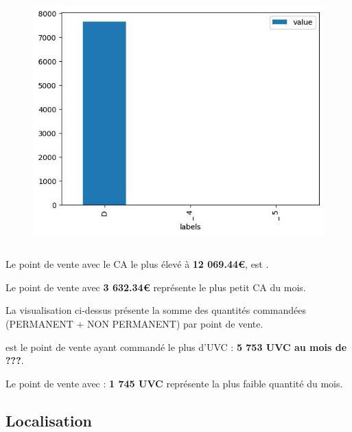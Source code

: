 \documentclass{beamer}
\begin{document}
\begin{frame}
\begin{columns}
\begin{column}{0.3333333333333333\textwidth}
\begin{center}
\begin{figure}[h]
                                \includegraphics[width=1\textwidth]{assets/ca_1.jpg}
                                \centering
                            \end{figure}
                        \end{center}
                    \end{column}
                            \end{columns}
        

        Le point de vente avec le CA le plus élevé à \textbf{12 069.44€}, est \textbf{}.\par
        Le point de vente \textbf{} avec \textbf{3 632.34€} représente le plus petit CA du mois.\par
        La visualisation ci-dessus présente la somme des quantités commandées (PERMANENT + NON PERMANENT) par point de vente.\par
        \textbf{} est le point de vente ayant commandé le plus d’UVC : \textbf{5 753 UVC au mois de ???}.\par
        Le point de vente \textbf{} avec : \textbf{1 745 UVC} représente la plus faible quantité du mois.\par
    \end{frame}
    \subsection{Localisation}

    \begin{frame}
    \end{frame}
\end{document}
